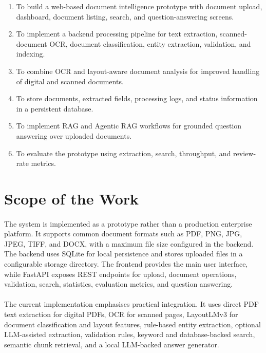 \begin{enumerate}
    \item To build a web-based document intelligence prototype with document upload, dashboard, document listing, search, and question-answering screens.
    \item To implement a backend processing pipeline for text extraction, scanned-document OCR, document classification, entity extraction, validation, and indexing.
    \item To combine OCR and layout-aware document analysis for improved handling of digital and scanned documents.
    \item To store documents, extracted fields, processing logs, and status information in a persistent database.
    \item To implement RAG and Agentic RAG workflows for grounded question answering over uploaded documents.
    \item To evaluate the prototype using extraction, search, throughput, and review-rate metrics.
\end{enumerate}

\section{Scope of the Work}
\paragraph{} The system is implemented as a prototype rather than a production enterprise platform. It supports common document formats such as PDF, PNG, JPG, JPEG, TIFF, and DOCX, with a maximum file size configured in the backend. The backend uses SQLite for local persistence and stores uploaded files in a configurable storage directory. The frontend provides the main user interface, while FastAPI exposes REST endpoints for upload, document operations, validation, search, statistics, evaluation metrics, and question answering.

\paragraph{} The current implementation emphasises practical integration. It uses direct PDF text extraction for digital PDFs, OCR for scanned pages, LayoutLMv3 for document classification and layout features, rule-based entity extraction, optional LLM-assisted extraction, validation rules, keyword and database-backed search, semantic chunk retrieval, and a local LLM-backed answer generator.

